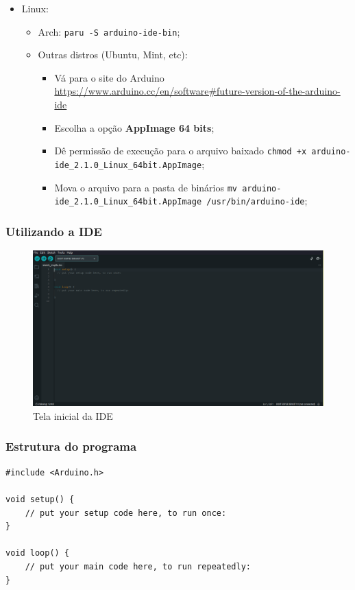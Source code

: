\documentclass[12pt]{beamer}
\begin{document}
\begin{frame}[allowframebreaks]
\begin{itemize}
        \framebreak%
        \item Linux:
        \begin{itemize}
            \item Arch: \texttt{paru -S arduino-ide-bin};
            \item Outras distros (Ubuntu, Mint, etc):
            \begin{itemize}
                \item Vá para o site do Arduino \url{https://www.arduino.cc/en/software\#future-version-of-the-arduino-ide}
                \item Escolha a opção \textbf{AppImage 64 bits};
                \item Dê permissão de execução para o arquivo baixado \texttt{chmod +x arduino-ide_2.1.0_Linux_64bit.AppImage};
                \item Mova o arquivo para a pasta de binários \texttt{mv arduino-ide_2.1.0_Linux_64bit.AppImage /usr/bin/arduino-ide};
            \end{itemize}
        \end{itemize}
    \end{itemize}
\end{frame}

\begin{frame}
    \frametitle{Utilizando a IDE}

    \begin{figure}
        \centering
        \includegraphics[height=.68\textheight]{ide}
        \caption{Tela inicial da IDE}
    \end{figure}

\end{frame}

\begin{frame}[t,fragile]
    \frametitle{Estrutura do programa}

    \begin{lstlisting}
#include <Arduino.h>

void setup() {
    // put your setup code here, to run once:
}

void loop() {
    // put your main code here, to run repeatedly:
}
    \end{lstlisting}


\end{frame}
\end{document}
